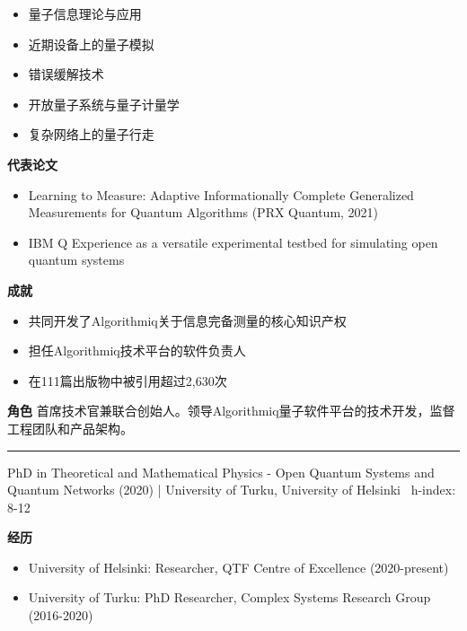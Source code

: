 \begin{itemize}[leftmargin=1.2em,itemsep=0pt,topsep=0pt]
\item {\footnotesize 量子信息理论与应用}
\item {\footnotesize 近期设备上的量子模拟}
\item {\footnotesize 错误缓解技术}
\item {\footnotesize 开放量子系统与量子计量学}
\item {\footnotesize 复杂网络上的量子行走}
\end{itemize}
\par{\footnotesize\color{mainred}\textbf{代表论文}}
\begin{itemize}[leftmargin=1.2em,itemsep=0pt,topsep=0pt]
\item {\footnotesize Learning to Measure: Adaptive Informationally Complete Generalized Measurements for Quantum Algorithms (PRX Quantum, 2021)}
\item {\footnotesize IBM Q Experience as a versatile experimental testbed for simulating open quantum systems}
\end{itemize}
\par{\footnotesize\color{mainred}\textbf{成就}}
\begin{itemize}[leftmargin=1.2em,itemsep=0pt,topsep=0pt]
\item {\footnotesize 共同开发了Algorithmiq关于信息完备测量的核心知识产权}
\item {\footnotesize 担任Algorithmiq技术平台的软件负责人}
\item {\footnotesize 在111篇出版物中被引用超过2,630次}
\end{itemize}
\par{\footnotesize\color{mainred}\textbf{角色}} {\footnotesize 首席技术官兼联合创始人。领导Algorithmiq量子软件平台的技术开发，监督工程团队和产品架构。}
\vspace{2pt}\hrule\vspace{2pt}
\vspace{4pt}
\par{\footnotesize\color{graytext}PhD in Theoretical and Mathematical Physics - Open Quantum Systems and Quantum Networks (2020) | University of Turku, University of Helsinki \textbar\  h-index: 8-12}
\par{\footnotesize\color{mainred}\textbf{经历}}
\begin{itemize}[leftmargin=1.2em,itemsep=0pt,topsep=0pt]
\item {\footnotesize University of Helsinki: Researcher, QTF Centre of Excellence (2020-present)}
\item {\footnotesize University of Turku: PhD Researcher, Complex Systems Research Group (2016-2020)}
\end{itemize}
